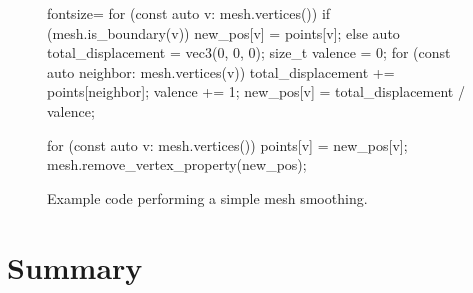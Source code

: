 \begin{figure}[p]
\begin{minipage}{.9\textwidth}
\begin{cppcode*}{fontsize=\footnotesize}
      for (const auto v: mesh.vertices()) {
          if (mesh.is_boundary(v)) {
              new_pos[v] = points[v];
          } else {
              auto total_displacement = vec3(0, 0, 0);
              size_t valence = 0;
              for (const auto neighbor: mesh.vertices(v)) {
                  total_displacement += points[neighbor];
                  valence += 1;
              }
              new_pos[v] = total_displacement / valence;
          }
      }

      for (const auto v: mesh.vertices()) {
          points[v] = new_pos[v];
      }
      mesh.remove_vertex_property(new_pos);
    \end{cppcode*}
  \end{minipage}

  \caption{
    Example code performing a simple mesh smoothing.
  }
  \label{fig:example-smooth}
\end{figure}


\newpage
\section{Summary}

\lipsum[1]
